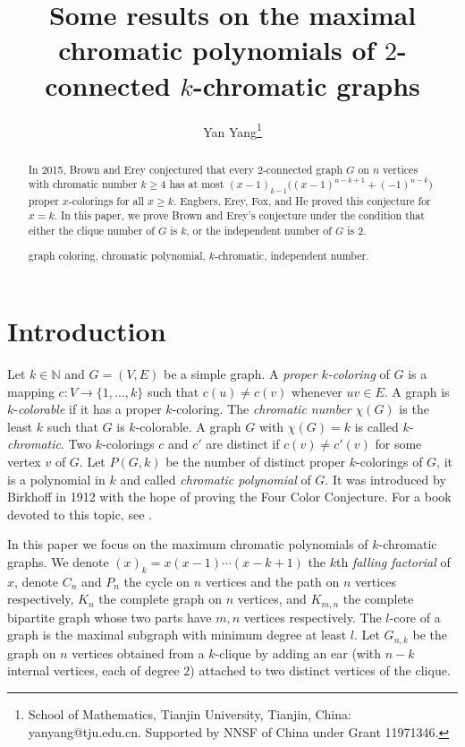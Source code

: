 \documentclass[12pt]{article}
\theoremstyle{definition}
\begin{document}
\title{Some results on the maximal chromatic polynomials of $2$-connected $k$-chromatic graphs}
\author{Yan Yang\thanks{School of Mathematics, Tianjin University, Tianjin, China: yanyang@tju.edu.cn. Supported by NNSF of China under Grant 11971346. }}

\date{}

\maketitle

\begin{abstract}
In 2015, Brown and Erey conjectured that every $2$-connected graph $G$ on $n$ vertices with chromatic number $k\geq 4$ has at most $(x-1)_{k-1}\big((x-1)^{n-k+1}+(-1)^{n-k}\big)$ proper $x$-colorings for all $x\geq k$. Engbers, Erey, Fox, and He proved this conjecture for $x=k$. In this paper, we prove Brown and Erey's conjecture under the condition that either the clique number of $G$ is $k$, or the independent number of $G$ is $2$.
\medskip

  graph coloring, chromatic polynomial, $k$-chromatic, independent number.

\smallskip
{}
\end{abstract}

\section{Introduction}

Let $k\in \mathbb{N}$ and $G=(V,E)$ be a simple graph. A {\it proper $k$-coloring} of $G$ is a mapping $c: V\rightarrow \{1,\ldots,k\}$ such that
$c(u)\neq c(v)$ whenever $uv\in E$. A graph is $k$-{\it colorable} if it has a proper $k$-coloring. The {\it chromatic number} $\chi(G)$ is the least $k$ such that $G$ is $k$-colorable. A graph $G$ with $\chi(G)=k$ is called $k$-{\it chromatic}.
Two $k$-colorings $c$ and $c'$ are distinct if $c(v)\neq c'(v)$ for some vertex $v$ of $G$. Let $P(G,k)$ be the number of distinct proper $k$-colorings of $G$, it is a polynomial in $k$ and called {\it chromatic polynomial} of $G$. It was introduced by Birkhoff \cite{B1912} in 1912 with the hope of proving the Four Color Conjecture. For a book devoted to this topic, see \cite{DKT05}.

In this paper we focus on the maximum chromatic polynomials of $k$-chromatic graphs. We denote $(x)_{k}=x(x-1)\cdots(x-k+1)$ the $k$th {\it falling factorial} of $x$, denote $C_n$ and $P_n$ the cycle on $n$ vertices and the path on $n$ vertices respectively, $K_n$ the complete graph on $n$ vertices, and $K_{m,n}$ the complete bipartite graph whose two parts have $m,n$ vertices respectively. The $l$-core of a graph is the maximal subgraph with minimum degree at least $l$. Let $G_{n,k}$ be the graph on $n$ vertices obtained from a $k$-clique by adding an ear (with $n-k$ internal vertices, each of degree $2$) attached to two distinct vertices of the clique.
\end{document}
